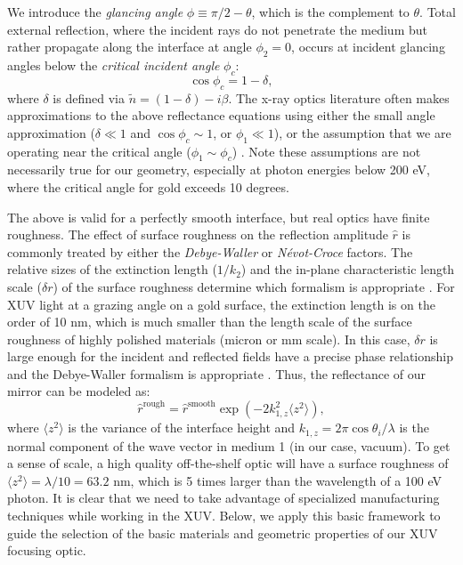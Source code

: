 We introduce the \textit{glancing angle} $\phi \equiv \pi/2 - \theta$, which is the complement to $\theta$. Total external reflection, where the incident rays do not penetrate the medium but rather propagate along the interface at angle $\phi_2 = 0$, occurs at incident glancing angles below the \textit{critical incident angle} $\phi_c$:
\begin{equation}
\cos \phi_c = 1 - \delta,
\end{equation}
where $\delta$ is defined via  $\tilde{n} = (1-\delta) - i \beta$. The x-ray optics literature often makes approximations to the above reflectance equations using either the small angle approximation ($\delta \ll 1$ and $\cos \phi_c \sim 1$, or $\phi_1 \ll 1$), or the assumption that we are operating near the critical angle ($\phi_1 \sim \phi_c$) \cite{attwoodSoftXraysExtreme2000}. Note these assumptions are not necessarily true for our geometry, especially at photon energies below 200 eV, where the critical angle for gold exceeds 10 degrees.

The above is valid for a perfectly smooth interface, but real optics have finite roughness. The effect of surface roughness on the reflection amplitude $\hat{r}$ is commonly treated by either the \textit{Debye-Waller} or \textit{N\'evot-Croce} factors. The relative sizes of the extinction length ($1/k_2$) and the in-plane characteristic length scale ($\delta r$) of the surface roughness determine which formalism is appropriate \cite{sentenacStatisticalAspectsWave2009, gibaudSpecularReflectivitySmooth2009}. For XUV light at a grazing angle on a gold surface, the extinction length is on the order of 10 nm, which is much smaller than the length scale of the surface roughness of highly polished materials (micron or mm scale). In this case, $\delta r$ is large enough for the incident and reflected fields have a precise phase relationship and the Debye-Waller formalism is appropriate \cite{stoevReviewGrazingIncidence1999}. Thus, the reflectance of our mirror can be modeled as:
\begin{equation}
\hat{r}^{\textrm{rough}} = \hat{r}^{\textrm{smooth}} \exp \left( -2 k_{1,z}^2 \langle z^2 \rangle \right),
\label{eqn:DW_2}
\end{equation}
where $ \langle z^2 \rangle$ is the variance of the interface height and $k_{1,z} = 2 \pi \cos \theta_i / \lambda$ is the normal component of the wave vector in medium 1 (in our case, vacuum). To get a sense of scale, a high quality off-the-shelf optic will have a surface roughness of $\langle z^2 \rangle = \lambda/10 = 63.2 \text{ nm}$, which is 5 times larger than the wavelength of a 100 eV photon. It is clear that we need to take advantage of specialized manufacturing techniques while working in the XUV. Below, we apply this basic framework to guide the selection of the basic materials and geometric properties of our XUV focusing optic. 


